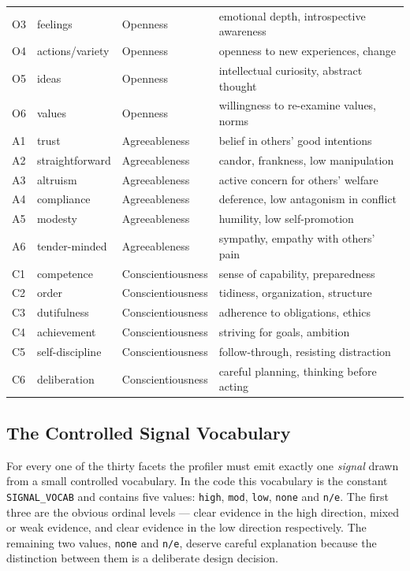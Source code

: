 \documentclass[../main.tex]{subfiles}
\begin{document}
\begin{longtable}{p{1.2cm}p{2.8cm}p{3.6cm}p{5.4cm}}
  O3 & feelings          & Openness          & emotional depth, introspective awareness \\
  O4 & actions/variety   & Openness          & openness to new experiences, change \\
  O5 & ideas             & Openness          & intellectual curiosity, abstract thought \\
  O6 & values            & Openness          & willingness to re-examine values, norms \\
  A1 & trust             & Agreeableness     & belief in others' good intentions \\
  A2 & straightforward   & Agreeableness     & candor, frankness, low manipulation \\
  A3 & altruism          & Agreeableness     & active concern for others' welfare \\
  A4 & compliance        & Agreeableness     & deference, low antagonism in conflict \\
  A5 & modesty           & Agreeableness     & humility, low self-promotion \\
  A6 & tender-minded     & Agreeableness     & sympathy, empathy with others' pain \\
  C1 & competence        & Conscientiousness & sense of capability, preparedness \\
  C2 & order             & Conscientiousness & tidiness, organization, structure \\
  C3 & dutifulness       & Conscientiousness & adherence to obligations, ethics \\
  C4 & achievement       & Conscientiousness & striving for goals, ambition \\
  C5 & self-discipline   & Conscientiousness & follow-through, resisting distraction \\
  C6 & deliberation      & Conscientiousness & careful planning, thinking before acting \\
\end{longtable}

\subsection{The Controlled Signal Vocabulary}
\label{subsec:signal-vocab}

For every one of the thirty facets the profiler must emit exactly one
\emph{signal} drawn from a small controlled vocabulary. In the code this
vocabulary is the constant \texttt{SIGNAL\_VOCAB} and contains five values:
\texttt{high}, \texttt{mod}, \texttt{low}, \texttt{none} and \texttt{n/e}. The
first three are the obvious ordinal levels --- clear evidence in the high
direction, mixed or weak evidence, and clear evidence in the low direction
respectively. The remaining two values, \texttt{none} and \texttt{n/e}, deserve
careful explanation because the distinction between them is a deliberate design
decision.
\end{document}
